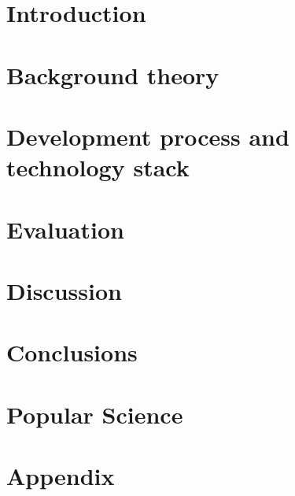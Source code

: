 \documentclass[nofilelist,dvipsnames]{cslthse-msc}
\begin{document}



\tableofcontents

\chapter{Introduction}

  

\chapter{Background theory}

  

\chapter{Development process and technology stack}

  

\chapter{Evaluation}

  

\chapter{Discussion}

  

\chapter{Conclusions}

  

\chapter*{Popular Science}

  


\chapter{Appendix}

  
\end{document}
